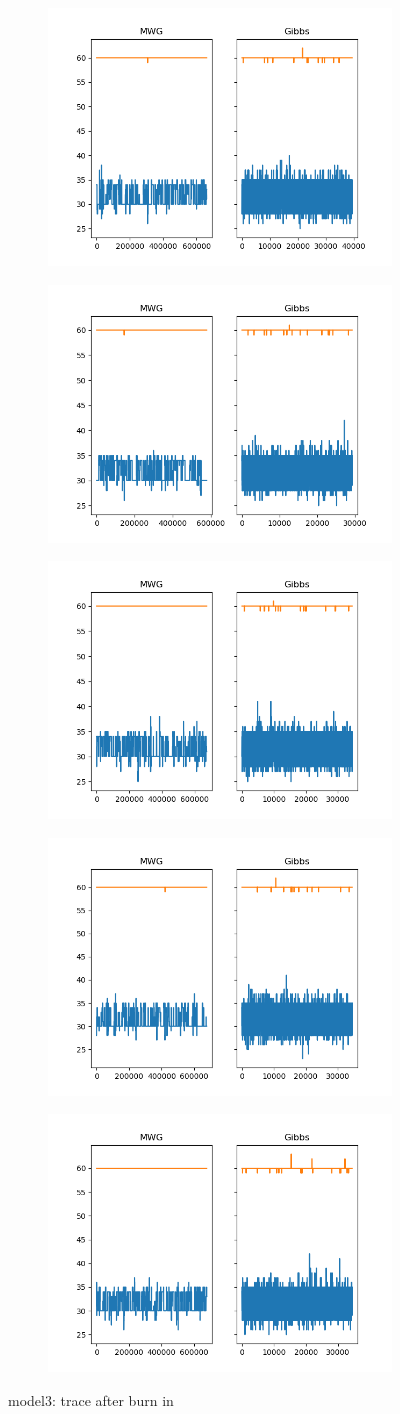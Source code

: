 \begin{figure}[h]
    \centering
    \begin{subfigure}
    	\centering
        \includegraphics[width=0.3\linewidth]{../../plots/Trace_post_burnin_M3_N100_NMCMC3_seed0_diffind2.png}
    \end{subfigure}
    \begin{subfigure}
        \centering
    	\includegraphics[width=0.3\linewidth]{../../plots/Trace_post_burnin_M3_N100_NMCMC3_seed1_diffind2.png}
	\end{subfigure}
	\begin{subfigure}
	    \centering
    	\includegraphics[width=0.3\linewidth]{../../plots/Trace_post_burnin_M3_N100_NMCMC3_seed2_diffind2.png}
	\end{subfigure}
	\begin{subfigure}
	    \centering
    	\includegraphics[width=0.3\linewidth]{../../plots/Trace_post_burnin_M3_N100_NMCMC3_seed3_diffind2.png}
	\end{subfigure}
	\begin{subfigure}
	    \centering
    	\includegraphics[width=0.3\linewidth]{../../plots/Trace_post_burnin_M3_N100_NMCMC3_seed4_diffind2.png}
	\end{subfigure}
	\caption{model3: trace after burn in}
\end{figure}


